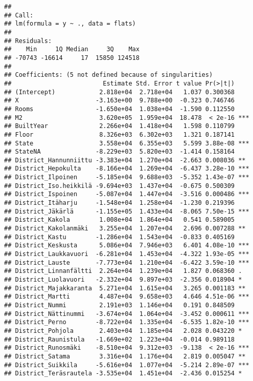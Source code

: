 \documentclass[
]{article}
\begin{document}
\begin{verbatim}
## 
## Call:
## lm(formula = y ~ ., data = flats)
## 
## Residuals:
##    Min     1Q Median     3Q    Max 
## -70743 -16614     17  15850 124518 
## 
## Coefficients: (5 not defined because of singularities)
##                         Estimate Std. Error t value Pr(>|t|)    
## (Intercept)            2.818e+04  2.718e+04   1.037 0.300368    
## X                     -3.163e+00  9.788e+00  -0.323 0.746746    
## Rooms                 -1.650e+04  1.038e+04  -1.590 0.112550    
## M2                     3.620e+05  1.959e+04  18.478  < 2e-16 ***
## BuiltYear              2.266e+04  1.418e+04   1.598 0.110799    
## Floor                  8.326e+03  6.302e+03   1.321 0.187141    
## State                  3.558e+04  6.355e+03   5.599 3.88e-08 ***
## StateNA               -8.229e+03  5.820e+03  -1.414 0.158164    
## District_Hannunniittu -3.383e+04  1.270e+04  -2.663 0.008036 ** 
## District_Hepokulta    -8.166e+04  1.269e+04  -6.437 3.28e-10 ***
## District_Ilpoinen     -5.185e+04  9.688e+03  -5.352 1.43e-07 ***
## District_Iso.heikkilä -9.694e+03  1.437e+04  -0.675 0.500309    
## District_Ispoinen     -5.087e+04  1.447e+04  -3.516 0.000486 ***
## District_Itäharju     -1.548e+04  1.258e+04  -1.230 0.219396    
## District_Jäkärlä      -1.155e+05  1.433e+04  -8.065 7.50e-15 ***
## District_Kakola        1.008e+04  1.864e+04   0.541 0.589005    
## District_Kakolanmäki   3.255e+04  1.207e+04   2.696 0.007288 ** 
## District_Kastu        -1.286e+04  1.543e+04  -0.833 0.405169    
## District_Keskusta      5.086e+04  7.946e+03   6.401 4.08e-10 ***
## District_Laukkavuori  -6.281e+04  1.453e+04  -4.322 1.93e-05 ***
## District_Lauste       -7.773e+04  1.210e+04  -6.422 3.59e-10 ***
## District_Linnanfältti  2.264e+04  1.239e+04   1.827 0.068360 .  
## District_Luolavuori   -2.332e+04  9.897e+03  -2.356 0.018904 *  
## District_Majakkaranta  5.271e+04  1.615e+04   3.265 0.001183 ** 
## District_Martti        4.487e+04  9.658e+03   4.646 4.51e-06 ***
## District_Nummi         2.191e+03  1.146e+04   0.191 0.848509    
## District_Nättinummi   -3.674e+04  1.064e+04  -3.452 0.000611 ***
## District_Perno        -8.722e+04  1.335e+04  -6.535 1.82e-10 ***
## District_Pohjola       2.403e+04  1.185e+04   2.028 0.043220 *  
## District_Raunistula   -1.669e+02  1.223e+04  -0.014 0.989118    
## District_Runosmäki    -8.510e+04  9.312e+03  -9.138  < 2e-16 ***
## District_Satama        3.316e+04  1.176e+04   2.819 0.005047 ** 
## District_Suikkila     -5.616e+04  1.077e+04  -5.214 2.89e-07 ***
## District_Teräsrautela -3.535e+04  1.451e+04  -2.436 0.015254 *  

\end{verbatim}
\end{document}
